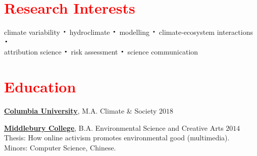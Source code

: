 \documentclass[margin, line]{res}
\newcommand*{\bigDot}{\raisebox{-0.25ex}{\scalebox{2.1}{$\cdot$}}}
\newcommand{\CU}{http://climatesociety.ei.columbia.edu/}
\newcommand{\Midd}{http://www.middlebury.edu/academics/es}
\begin{document}
 



\begin{resume}



\section{\sc \textcolor{Red}{\large{Research Interests}}}
climate variability $\bigDot$  hydroclimate $\bigDot$  modelling $\bigDot$  climate-ecosystem interactions $\bigDot$  \\attribution science $\bigDot$ risk assessment $\bigDot$ science communication  


\vspace{0.15in}
\section{\sc \textcolor{Red}{\large{Education}}}

{\bf \href{\CU}{Columbia University}}, M.A. Climate \& Society \hfill {$2018$}
\\
    \vspace*{-.15in} 
  
{\bf \href{\Midd}{Middlebury College}}, B.A. Environmental Science and Creative Arts 
\hfill {$2014$}
\\
    Thesis:  How online activism promotes environmental good (multimedia).   \\ 
    Minors: Computer Science, Chinese. 
 


\end{resume}
\end{document}
